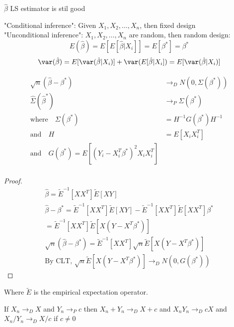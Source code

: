 \documentclass[answers,12pt,addpoints]{exam}
\begin{document}
\begin{remark}
    $\hat{\beta}$ LS estimator is stil good

    "Conditional inference": Given $X_1, X_2, \ldots, X_n$, then fixed design\\
    "Unconditional inference": $X_1, X_2, \ldots, X_n$ are random, then random design: 
    $$E(\hat{\beta}) = E[E[\hat{\beta}|X_i]] = E[\beta^*] = \beta^*$$
    $$\var(\hat{\beta}) = E[\var(\hat{\beta}|X_i)] + \var(E[\hat{\beta}|X_i]) = E[\var(\hat{\beta}|X_i)]$$
\end{remark}
\begin{proposition}
    \begin{align*}
        \sqrt{n}(\hat{\beta} - \beta^*) &\to_D N(0, \Sigma(\beta^*))\\
        \hat{\Sigma}(\hat{\beta}^*) &\to_P \Sigma(\beta^*)\\
        \text{where} \quad \Sigma(\beta^*) &= H^{-1}G(\beta^*) H^{-1}\\
        \text{and} \quad H &= E[X_i X_i^T]\\
        \text{and} \quad G(\beta^*) = E[(Y_i - X_i^T \beta^*)^2 X_i X_i^T]\\
    \end{align*}
    \begin{proof}
        \begin{align*}
            \hat \beta = \tilde{E}^{-1}[XX^T] \tilde{E}[XY]\\
            \hat \beta - \beta^* = \tilde{E}^{-1}[XX^T] \tilde{E}[XY] - \tilde{E}^{-1}[XX^T] \tilde{E}[XX^T] \beta^*\\
            = \tilde{E}^{-1}[XX^T] \tilde{E}[X(Y - X^T \beta^*)]\\
            \sqrt{n}(\hat \beta - \beta^*) = \tilde{E}^{-1}[XX^T] \sqrt{n} \tilde{E}[X(Y - X^T \beta^*)]\\
            \text{By CLT, } \sqrt{n} \tilde{E}[X(Y - X^T \beta^*)] \to_D N(0, G(\beta^*))
        \end{align*}
    \end{proof}
    Where $\tilde{E}$ is the empirical expectation operator.
\end{proposition}

\begin{theorem}
    If $X_n \to_D X$ and $Y_n \to_P c$ then $X_n + Y_n \to_D X + c$ and $X_n Y_n \to_D cX$ and $X_n / Y_n \to_D X / c$ if $c \neq 0$
\end{theorem}
\end{document}
